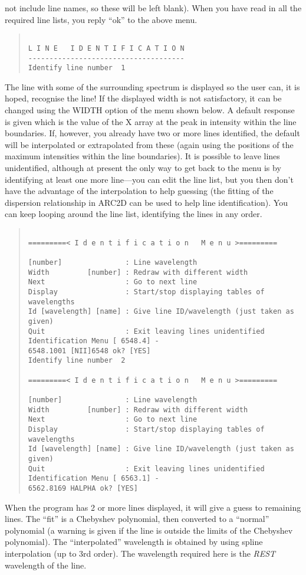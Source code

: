 not include line names, so these will be left blank).
When you have read in all the required line lists, you reply ``ok'' to
the above menu.
\begin{quote}\begin{verbatim}

L I N E   I D E N T I F I C A T I O N
-------------------------------------
Identify line number  1
\end{verbatim}\end{quote}
The line with some of the surrounding spectrum is displayed so the user
can, it is hoped, recognise the line!
If the displayed width is not satisfactory, it can be changed using the
WIDTH option of the menu shown below.
A default response is given which is the value of the X array at the
peak in intensity within the line boundaries.
If, however, you already have two or more lines identified, the default
will be interpolated or extrapolated from these (again using the
positions of the maximum intensities within the line boundaries).
It is possible to leave lines unidentified, although at present the only
way to get back to the menu is by identifying at least one more
line---you can edit the line list, but you then don't have the advantage
of the interpolation to help guessing (the fitting of the dispersion
relationship in ARC2D can be used to help line identification).
You can keep looping around the line list, identifying the lines in any
order.
\begin{quote}\begin{verbatim}

=========< I d e n t i f i c a t i o n   M e n u >=========

[number]               : Line wavelength
Width         [number] : Redraw with different width
Next                   : Go to next line
Display                : Start/stop displaying tables of wavelengths
Id [wavelength] [name] : Give line ID/wavelength (just taken as given)
Quit                   : Exit leaving lines unidentified
Identification Menu [ 6548.4] -
6548.1001 [NII]6548 ok? [YES]
Identify line number  2

=========< I d e n t i f i c a t i o n   M e n u >=========

[number]               : Line wavelength
Width         [number] : Redraw with different width
Next                   : Go to next line
Display                : Start/stop displaying tables of wavelengths
Id [wavelength] [name] : Give line ID/wavelength (just taken as given)
Quit                   : Exit leaving lines unidentified
Identification Menu [ 6563.1] -
6562.8169 HALPHA ok? [YES]
\end{verbatim}\end{quote}
When the program has 2 or more lines displayed, it will give a guess to
remaining lines.
The ``fit'' is a Chebyshev polynomial, then converted to a ``normal''
polynomial (a warning is given if the line is outside the limits of the
Chebyshev polynomial).
The ``interpolated'' wavelength is obtained by using spline
interpolation (up to 3rd order).
The wavelength required here is the {\em REST} wavelength of the line.

